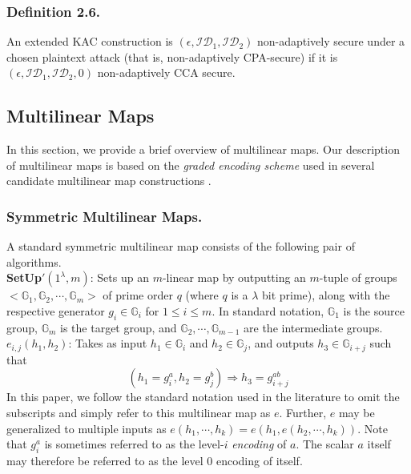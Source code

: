 \subsubsection{Definition 2.6.}
An extended KAC construction is $(\epsilon,\mathcal{ID}_1,\mathcal{ID}_2)$ non-adaptively secure under a chosen plaintext attack (that is, non-adaptively CPA-secure) if it is $(\epsilon,\mathcal{ID}_1,\mathcal{ID}_2,0)$ non-adaptively CCA secure.
 

\subsection{Multilinear Maps}
\label{subsec:multilinear}

In this section, we provide a brief overview of multilinear maps. Our description of multilinear maps is based on the \emph{graded encoding scheme} used in several candidate multilinear map constructions \cite{garg2013candidate}.

\subsubsection{Symmetric Multilinear Maps.} A standard symmetric multilinear map consists of the following pair of algorithms.\\

\noindent\textbf{SetUp}$'(1^\lambda,m)$: Sets up an $m$-linear map by outputting an $m$-tuple of groups $<\mathbb{G}_1,\mathbb{G}_2,\cdots,\mathbb{G}_m>$ of prime order $q$ (where $q$ is a $\lambda$ bit prime), along with the respective generator $g_i\in\mathbb{G}_i$ for $1\leq i\leq m$. In standard notation, $\mathbb{G}_1$ is the source group, $\mathbb{G}_m$ is the target group, and $\mathbb{G}_2,\cdots,\mathbb{G}_{m-1}$ are the intermediate groups.\\

\noindent$e_{i,j}(h_1,h_2)$: Takes as input $h_1\in\mathbb{G}_i$ and $h_2\in\mathbb{G}_j$, and outputs $h_3\in\mathbb{G}_{i+j}$ such that
\begin{equation}
 (h_1=g_i^a,h_2=g_j^b) \Rightarrow h_3=g_{i+j}^{ab}\nonumber
\end{equation}
\noindent In this paper, we follow the standard notation used in the literature to omit the subscripts and simply refer to this multilinear map as $e$. Further, $e$ may be generalized to multiple inputs as $e(h_1,\cdots,h_k)=e(h_1,e(h_2,\cdots,h_k))$. Note that $g^a_i$ is sometimes referred to as the level-$i$ \emph{encoding} of $a$. The scalar $a$ itself may therefore be referred to as the level $0$ encoding of itself.

